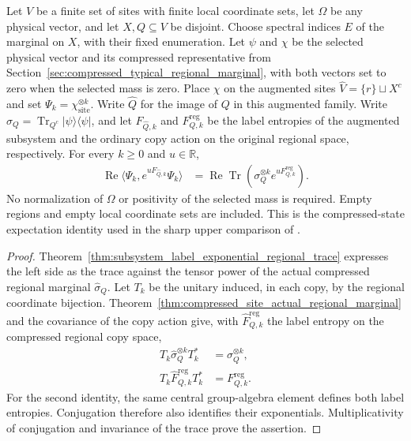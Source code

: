 \begin{theorem}
    \label{thm:compressed_typical_exponential_regional_trace}
    \leanok
    Let $V$ be a finite set of sites with finite local coordinate sets,
    let $\Omega$ be any physical vector, and let $X,Q\subseteq V$ be disjoint.
    Choose spectral indices $E$ of the marginal on $X$, with their fixed
    enumeration. Let $\psi$ and $\chi$ be the selected physical vector and
    its compressed representative from
    Section~\ref{sec:compressed_typical_regional_marginal}, with both
    vectors set to zero when the selected mass is zero. Place $\chi$ on
    the augmented sites $\widehat V=\{r\}\sqcup X^c$ and set
    $\Psi_k=\chi_{\mathrm{site}}^{\otimes k}$. Write $\widehat Q$ for
    the image of $Q$ in this augmented family.
    Write $\sigma_Q=\operatorname{Tr}_{Q^c}|\psi\rangle\langle\psi|$,
    and let $F_{\widehat Q,k}$ and $F^{\mathrm{reg}}_{Q,k}$ be the label
    entropies of the augmented subsystem and the ordinary copy action on
    the original regional space, respectively. For every $k\ge0$ and
    $u\in\mathbb R$,
    \begin{align}
        \operatorname{Re}\langle\Psi_k,e^{uF_{\widehat Q,k}}\Psi_k\rangle
         & =\operatorname{Re}\operatorname{Tr}\!\left(
        \sigma_Q^{\otimes k}e^{uF^{\mathrm{reg}}_{Q,k}}\right).
    \end{align}
    No normalization of $\Omega$ or positivity of the selected mass is
    required. Empty regions and empty local coordinate sets are included.
    This is the compressed-state expectation identity used in the sharp
    upper comparison of \cite[Section~8]{OpenAI2026AreaLaw}.
\end{theorem}
\begin{proof}
    \leanok
    Theorem~\ref{thm:subsystem_label_exponential_regional_trace} expresses
    the left side as the trace against the tensor power of the actual
    compressed regional marginal $\widehat\sigma_Q$. Let $T_k$ be the
    unitary induced, in each copy, by the regional coordinate bijection.
    Theorem~\ref{thm:compressed_site_actual_regional_marginal} and the
    covariance of the copy action give, with $\widehat F^{\mathrm{reg}}_{Q,k}$
    the label entropy on the compressed regional copy space,
    \begin{align}
        T_k\widehat\sigma_Q^{\otimes k}T_k^*
         & =\sigma_Q^{\otimes k},   \\
        T_k\widehat F^{\mathrm{reg}}_{Q,k}T_k^*
         & =F^{\mathrm{reg}}_{Q,k}.
    \end{align}
    For the second identity, the same central group-algebra element
    defines both label entropies. Conjugation therefore also identifies
    their exponentials. Multiplicativity of conjugation and invariance
    of the trace prove the assertion.
\end{proof}


